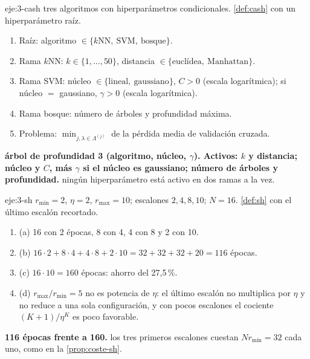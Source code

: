 \begin{solucion}{eje:3-cash}
\datos tres algoritmos con hiperparámetros condicionales.
\planteamiento \cref{def:cash} con un hiperparámetro raíz.
\pasos
\begin{enumerate}[label=\arabic*.]
  \item Raíz: algoritmo $\in\{k\text{NN},\ \text{SVM},\ \text{bosque}\}$.
  \item Rama $k$NN: $k\in\{1,\dots,50\}$, distancia $\in\{\text{euclídea},\ \text{Manhattan}\}$.
  \item Rama SVM: núcleo $\in\{\text{lineal},\ \text{gaussiano}\}$, $C>0$ (escala logarítmica); si núcleo $=$ gaussiano, $\gamma>0$ (escala logarítmica).
  \item Rama bosque: número de árboles y profundidad máxima.
  \item Problema: $\min_{j,\lambda\in\Lambda^{(j)}}$ de la pérdida media de validación cruzada.
\end{enumerate}
\resultado \textbf{árbol de profundidad 3 (algoritmo, núcleo, $\gamma$). Activos: $k$ y distancia; núcleo y $C$, más $\gamma$ si el núcleo es gaussiano; número de árboles y profundidad.}
\comprobacion ningún hiperparámetro está activo en dos ramas a la vez.
\end{solucion}

\begin{solucion}{eje:3-sh}
\datos $r_{\min}=2$, $\eta=2$, $r_{\max}=10$; escalones $2,4,8,10$; $N=16$.
\planteamiento \cref{def:sh} con el último escalón recortado.
\pasos
\begin{enumerate}[label=\arabic*.]
  \item (a) 16 con 2 épocas, 8 con 4, 4 con 8 y 2 con 10.
  \item (b) $16\cdot2+8\cdot4+4\cdot8+2\cdot10=32+32+32+20=116$ épocas.
  \item (c) $16\cdot10=160$ épocas: ahorro del 27{,}5\,\%.
  \item (d) $r_{\max}/r_{\min}=5$ no es potencia de $\eta$: el último escalón no multiplica por $\eta$ y no reduce a una sola configuración, y con pocos escalones el cociente $(K+1)/\eta^{K}$ es poco favorable.
\end{enumerate}
\resultado \textbf{116 épocas frente a 160.}
\comprobacion los tres primeros escalones cuestan $Nr_{\min}=32$ cada uno, como en la \cref{prop:coste-sh}.
\end{solucion}

